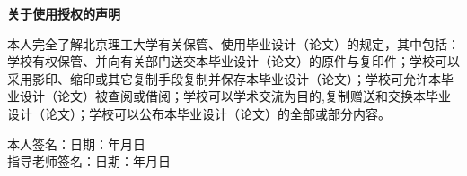 \vspace{18mm}

\begin{center}
  \heiti{}\textbf{关于使用授权的声明}
\end{center}

本人完全了解北京理工大学有关保管、使用毕业设计（论文）的规定，其中包括：学校有权保管、并向有关部门送交本毕业设计（论文）的原件与复印件；学校可以采用影印、缩印或其它复制手段复制并保存本毕业设计（论文）；学校可允许本毕业设计（论文）被查阅或借阅；学校可以学术交流为目的,复制赠送和交换本毕业设计（论文）；学校可以公布本毕业设计（论文）的全部或部分内容。

\vspace*{1mm}

\begin{flushright}
  \begin{spacing}{1.65}
    本人签名：\hspace{40mm}日\hspace{2.5mm}期：\hspace{13mm}年\hspace{8mm}月\hspace{8mm}日\\
    指导老师签名：\hspace{40mm}日\hspace{2.5mm}期：\hspace{13mm}年\hspace{8mm}月\hspace{8mm}日
  \end{spacing}
\end{flushright}

\newpage
